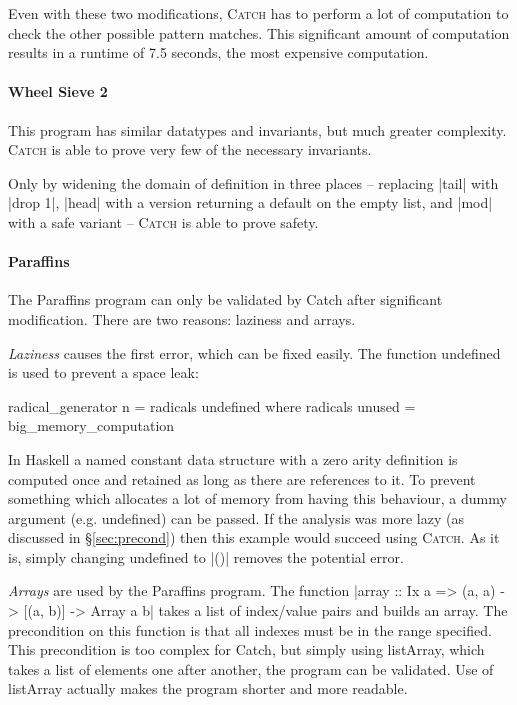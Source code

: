 \documentclass[preprint]{sigplanconf}
\newcommand{\C}[1]{\textsf{#1}}
\newcommand{\catch}{\textsc{Catch}}
\begin{document}
Even with these two modifications, \catch{} has to perform a lot of computation to check the other possible pattern matches. This significant amount of computation results in a runtime of 7.5 seconds, the most expensive computation.


\paragraph{Wheel Sieve 2}

This program has similar datatypes and invariants, but much greater complexity. \catch{} is able to prove very few of the necessary invariants.

Only by widening the domain of definition in three places -- replacing |tail| with |drop 1|, |head| with a version returning a default on the empty list, and |mod| with a safe variant -- \catch{} is able to prove safety.


\paragraph{Paraffins}

The Paraffins program can only be validated by Catch after significant modification. There are two reasons: laziness and arrays.

\textit{Laziness} causes the first error, which can be fixed easily. The function \C{undefined} is used to prevent a space leak:

\begin{code}
radical_generator n = radicals undefined
  where radicals unused = big_memory_computation
\end{code}

In Haskell a named constant data structure with a zero arity definition is computed once and retained as long as there are references to it. To prevent something which allocates a lot of memory from having this behaviour, a dummy argument (e.g. \C{undefined}) can be passed. If the analysis was more lazy (as discussed in \S\ref{sec:precond}) then this example would succeed using \catch{}. As it is, simply changing \C{undefined} to |()| removes the potential error.

\textit{Arrays} are used by the Paraffins program. The function |array :: Ix a => (a, a) -> [(a, b)] -> Array a b| takes a list of index/value pairs and builds an array. The precondition on this function is that all indexes must be in the range specified. This precondition is too complex for Catch, but simply using \C{listArray}, which takes a list of elements one after another, the program can be validated. Use of \C{listArray} actually makes the program shorter and more readable.
\end{document}
